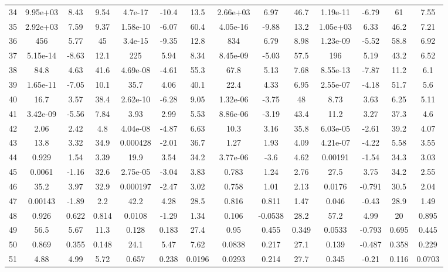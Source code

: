 \begin{longtable}{lccccccccccccc}
34 & 9.95e+03 & 8.43 & 9.54 & 4.7e-17 & -10.4 & 13.5 & 2.66e+03 & 6.97 & 46.7 & 1.19e-11 & -6.79 & 61 & 7.55\\
35 & 2.92e+03 & 7.59 & 9.37 & 1.58e-10 & -6.07 & 60.4 & 4.05e-16 & -9.88 & 13.2 & 1.05e+03 & 6.33 & 46.2 & 7.21\\
36 & 456 & 5.77 & 45 & 3.4e-15 & -9.35 & 12.8 & 834 & 6.79 & 8.98 & 1.23e-09 & -5.52 & 58.8 & 6.92\\
37 & 5.15e-14 & -8.63 & 12.1 & 225 & 5.94 & 8.34 & 8.45e-09 & -5.03 & 57.5 & 196 & 5.19 & 43.2 & 6.52\\
38 & 84.8 & 4.63 & 41.6 & 4.69e-08 & -4.61 & 55.3 & 67.8 & 5.13 & 7.68 & 8.55e-13 & -7.87 & 11.2 & 6.1\\
39 & 1.65e-11 & -7.05 & 10.1 & 35.7 & 4.06 & 40.1 & 22.4 & 4.33 & 6.95 & 2.55e-07 & -4.18 & 51.7 & 5.6\\
40 & 16.7 & 3.57 & 38.4 & 2.62e-10 & -6.28 & 9.05 & 1.32e-06 & -3.75 & 48 & 8.73 & 3.63 & 6.25 & 5.11\\
41 & 3.42e-09 & -5.56 & 7.84 & 3.93 & 2.99 & 5.53 & 8.86e-06 & -3.19 & 43.4 & 11.2 & 3.27 & 37.3 & 4.6\\
42 & 2.06 & 2.42 & 4.8 & 4.04e-08 & -4.87 & 6.63 & 10.3 & 3.16 & 35.8 & 6.03e-05 & -2.61 & 39.2 & 4.07\\
43 & 13.8 & 3.32 & 34.9 & 0.000428 & -2.01 & 36.7 & 1.27 & 1.93 & 4.09 & 4.21e-07 & -4.22 & 5.58 & 3.55\\
44 & 0.929 & 1.54 & 3.39 & 19.9 & 3.54 & 34.2 & 3.77e-06 & -3.6 & 4.62 & 0.00191 & -1.54 & 34.3 & 3.03\\
45 & 0.0061 & -1.16 & 32.6 & 2.75e-05 & -3.04 & 3.83 & 0.783 & 1.24 & 2.76 & 27.5 & 3.75 & 34.2 & 2.55\\
46 & 35.2 & 3.97 & 32.9 & 0.000197 & -2.47 & 3.02 & 0.758 & 1.01 & 2.13 & 0.0176 & -0.791 & 30.5 & 2.04\\
47 & 0.00143 & -1.89 & 2.2 & 42.2 & 4.28 & 28.5 & 0.816 & 0.811 & 1.47 & 0.046 & -0.43 & 28.9 & 1.49\\
48 & 0.926 & 0.622 & 0.814 & 0.0108 & -1.29 & 1.34 & 0.106 & -0.0538 & 28.2 & 57.2 & 4.99 & 20 & 0.895\\
49 & 56.5 & 5.67 & 11.3 & 0.128 & 0.183 & 27.4 & 0.95 & 0.455 & 0.349 & 0.0533 & -0.793 & 0.695 & 0.445\\
50 & 0.869 & 0.355 & 0.148 & 24.1 & 5.47 & 7.62 & 0.0838 & 0.217 & 27.1 & 0.139 & -0.487 & 0.358 & 0.229\\
51 & 4.88 & 4.99 & 5.72 & 0.657 & 0.238 & 0.0196 & 0.0293 & 0.214 & 27.7 & 0.345 & -0.21 & 0.116 & 0.0703\\

\end{longtable}
